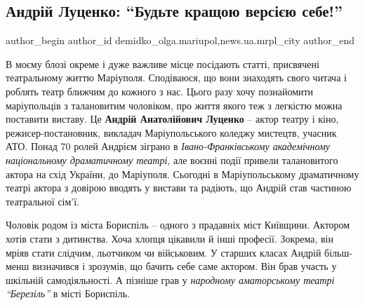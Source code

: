  
 
 
 
 
 
\subsection{Андрій Луценко: \enquote{Будьте кращою версією себе!}}
\label{sec:03_10_2020.stz.news.ua.mrpl_city.1.andrij_lucenko_krascha_versia_sebe}
 
\ifcmt
 author_begin
   author_id demidko_olga.mariupol,news.ua.mrpl_city
 author_end
\fi


В моєму блозі окреме і дуже важливе місце посідають статті, присвячені
театральному життю Маріуполя. Сподіваюся, що вони знаходять свого читача і
роблять театр ближчим до кожного з нас. Цього разу хочу познайомити
маріупольців з талановитим чоловіком, про життя якого теж з легкістю можна
поставити виставу. Це \textbf{Андрій Анатолійович Луценко} – актор театру і кіно,
режисер-постановник, викладач Маріупольського коледжу мистецтв, учасник АТО.
Понад 70 ролей Андрієм зіграно в \emph{Івано-Франківському академічному національному
драматичному театрі}, але воєнні події привели талановитого актора на схід
України, до Маріуполя. Сьогодні в Маріупольському драматичному театрі актора з
довірою вводять у вистави та радіють, що Андрій став частиною театральної
сім'ї.

Чоловік родом із міста Бориспіль – одного з прадавніх міст Київщини. Актором
хотів стати з дитинства. Хоча хлопця цікавили й інші професії. Зокрема, він
мріяв стати слідчим, льотчиком чи військовим. У старших класах Андрій
більш-менш визначився і зрозумів, що бачить себе саме актором. Він брав участь
у шкільній самодіяльності. А пізніше грав у \emph{народному аматорському театрі
\enquote{Березіль}} в місті Бориспіль. 


